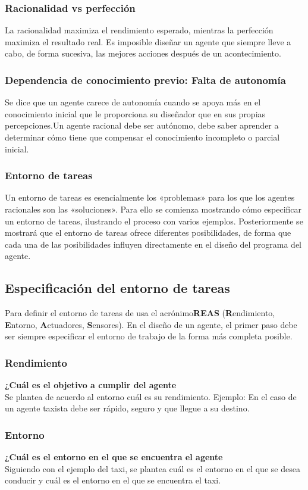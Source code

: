 \documentclass[12pt,a4paper]{report}
\begin{document}
\subsubsection*{Racionalidad vs perfección}
La racionalidad maximiza el rendimiento esperado, mientras la perfección maximiza el resultado real. Es imposible diseñar un agente que siempre lleve a cabo, de forma sucesiva, las mejores acciones después de un acontecimiento.
\subsubsection*{Dependencia de conocimiento previo: Falta de autonomía}
Se dice que un agente carece de autonomía cuando se apoya más en el conocimiento inicial que le proporciona su diseñador que en sus propias percepciones.Un agente racional debe ser autónomo, debe saber aprender a determinar cómo tiene que compensar el conocimiento incompleto o parcial inicial.
\subsubsection*{Entorno de tareas}
Un entorno de tareas es esencialmente los «problemas» para los que los agentes racionales son las «soluciones». Para ello se comienza mostrando cómo especificar un entorno de tareas, ilustrando el proceso con varios ejemplos. Posteriormente se mostrará que el entorno de tareas ofrece diferentes posibilidades, de forma que cada una de las posibilidades influyen directamente en el diseño del programa del agente.
\subsection*{Especificación del entorno de tareas}
Para definir el entorno de tareas de usa el acrónimo\textbf{REAS} (\textbf{R}endimiento, \textbf{E}ntorno, \textbf{A}ctuadores, \textbf{S}ensores). En el diseño de un agente, el primer paso debe ser siempre especificar el entorno de trabajo de la forma más completa posible.
\subsubsection*{Rendimiento}
\textbf{¿Cuál es el objetivo a cumplir del agente}\\Se plantea de acuerdo al entorno cuál es su rendimiento. Ejemplo: En el caso de un agente taxista debe ser rápido, seguro y que llegue a su destino.
\subsubsection*{Entorno}
\textbf{¿Cuál es el entorno en el que se encuentra el agente}\\Siguiendo con el ejemplo del taxi, se plantea cuál es el entorno en el que se desea conducir y cuál es el entorno en el que se encuentra el taxi.  
\end{document}
